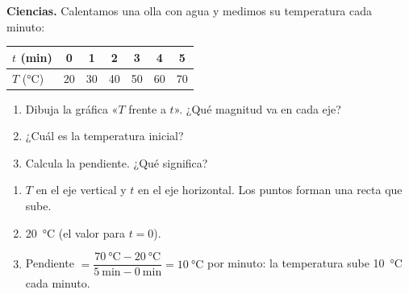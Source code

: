 \begin{exercise}
    \textbf{Ciencias.} Calentamos una olla con agua y medimos su temperatura cada minuto:
    \begin{center}
        \begin{tabular}{lcccccc}
            \toprule
            \(t\) (min) & 0 & 1 & 2 & 3 & 4 & 5 \\
            \midrule
            \(T\) (\unit{\celsius}) & 20 & 30 & 40 & 50 & 60 & 70 \\
            \bottomrule
        \end{tabular}
    \end{center}
    \begin{enumerate}[label=\letraminuscula]
        \item Dibuja la gráfica «\(T\) frente a \(t\)». ¿Qué magnitud va en cada eje?
        \item ¿Cuál es la temperatura inicial?
        \item Calcula la pendiente. ¿Qué significa?
    \end{enumerate}
    \begin{solu}
        \begin{enumerate}[label=\alph*)]
            \item \(T\) en el eje vertical y \(t\) en el eje horizontal. Los puntos forman una recta que sube.
            \item \qty{20}{\celsius} (el valor para \(t = 0\)).
            \item Pendiente \(= \dfrac{\qty{70}{\celsius} - \qty{20}{\celsius}}{\qty{5}{\minute} - \qty{0}{\minute}} = \qty{10}{\celsius}\) por minuto: la temperatura sube \qty{10}{\celsius} cada minuto.
        \end{enumerate}
    \end{solu}
\end{exercise}

